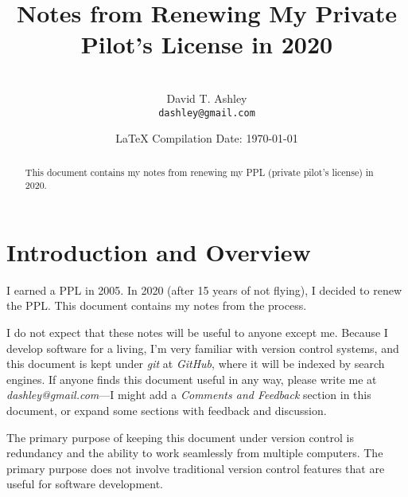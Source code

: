 \documentclass[letterpaper,10pt,titlepage]{article}
\begin{document}
\title{Notes from Renewing My Private Pilot's License in 2020}
\author{\vspace{4cm}\\David T. Ashley\\\texttt{dashley@gmail.com}\\\vspace{4cm}}
\date{\small{\LaTeX{} Compilation Date: \today{}}}
\maketitle

%
\begin{abstract}
This document contains my notes from renewing my PPL (private pilot's license)
in 2020.
\end{abstract}

\clearpage{}
\tableofcontents{}
\clearpage{}

%
\setcounter{page}{1}

\section{Introduction and Overview}
\label{siov0}

I earned a PPL in 2005.  In 2020 (after 15 years of not flying), I decided
to renew the PPL.  This document contains my notes from the process.

I do not expect that these notes will be useful to anyone except me.  Because I
develop software for a living, I'm very familiar with version control systems,
and this document is kept under \emph{git} at \emph{GitHub}, where it will
be indexed by search
engines.  If anyone finds this document useful in any way, please write me
at \emph{dashley@gmail.com}---I might add a \emph{Comments and Feedback}
section in this document, or expand some sections with feedback and discussion.

The primary purpose of keeping this document under version control is
redundancy and the ability to work seamlessly from multiple computers.  The
primary purpose does not involve traditional version control features that are
useful for software development.
\end{document}
